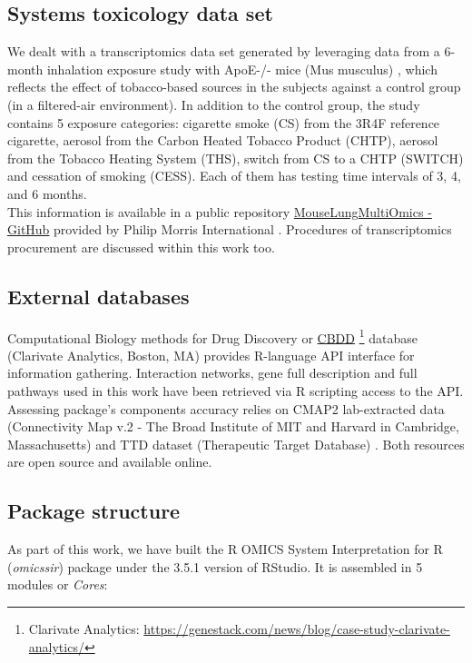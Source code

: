 \subsection{Systems toxicology data set}
We dealt with a transcriptomics data set generated by leveraging data from a 6-month inhalation exposure study with ApoE-/- mice (Mus musculus) \cite{LoSasso2016TheReduction} \cite{Phillips2016AnCigarettes}, which reflects the effect of tobacco-based sources in the subjects against a control group (in a filtered-air environment). In addition to the control group, the study contains 5 exposure categories: cigarette smoke (CS) from the 3R4F reference cigarette, aerosol from the Carbon Heated Tobacco Product (CHTP), aerosol from the Tobacco Heating System (THS), switch from CS to a CHTP (SWITCH) and cessation of smoking (CESS). Each of them has testing time intervals of 3, 4, and 6 months.
\\

This information is available in a public repository \href{https://github.com/philipmorrisintl/MouseLungMultiOmics}{MouseLungMultiOmics - GitHub} provided by Philip Morris International \cite{Titz2020Multi-omicsSmoke}. Procedures of transcriptomics procurement are discussed within this work too.
\\

\subsection{External databases}
\label{section:external-db}
Computational Biology methods for Drug Discovery or \href{https://genestack.com/news/blog/case-study-clarivate-analytics/}{CBDD} \footnote{Clarivate Analytics: \url{https://genestack.com/news/blog/case-study-clarivate-analytics/}} database (Clarivate Analytics, Boston, MA) provides R-language API interface for information gathering. Interaction networks, gene full description and full pathways used in this work have been retrieved via R scripting access to the API.
\\

Assessing package’s components accuracy relies on CMAP2 lab-extracted data (Connectivity Map v.2 - The Broad Institute of MIT and Harvard in Cambridge, Massachusetts) \cite{Subramanian2017AProfiles} and TTD dataset (Therapeutic Target Database) \cite{Wang2020TherapeuticTherapeutics}.
Both resources are open source and available online.
\\

\subsection{Package structure}
As part of this work, we have built the R OMICS System Interpretation for R (\textit{omicssir}) package under the 3.5.1 version of RStudio. It is assembled in 5 modules or \textit{Cores}:
\\


